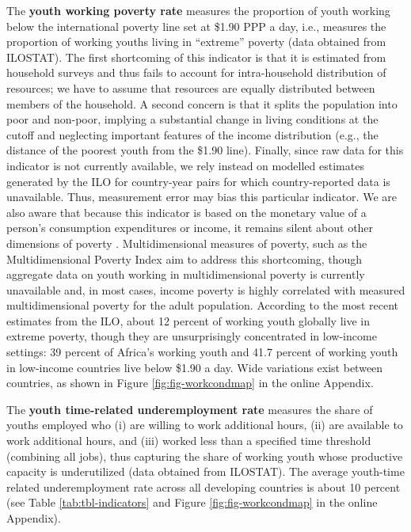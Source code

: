 \documentclass[
  a4paper, twoside, 12pt]{book}
\begin{document}
The \textbf{youth working poverty rate} measures the proportion of youth working below the international poverty line set at \$1.90 PPP a day, i.e., measures the proportion of working youths living in ``extreme'' poverty (data obtained from ILOSTAT). The first shortcoming of this indicator is that it is estimated from household surveys and thus fails to account for intra-household distribution of resources; we have to assume that resources are equally distributed between members of the household. A second concern is that it splits the population into poor and non-poor, implying a substantial change in living conditions at the cutoff and neglecting important features of the income distribution (e.g., the distance of the poorest youth from the \$1.90 line). Finally, since raw data for this indicator is not currently available, we rely instead on modelled estimates generated by the ILO for country-year pairs for which country-reported data is unavailable. Thus, measurement error may bias this particular indicator. We are also aware that because this indicator is based on the monetary value of a person's consumption expenditures or income, it remains silent about other dimensions of poverty \autocite{ophi2015}. Multidimensional measures of poverty, such as the Multidimensional Poverty Index \autocite{alkire2011} aim to address this shortcoming, though aggregate data on youth working in multidimensional poverty is currently unavailable and, in most cases, income poverty is highly correlated with measured multidimensional poverty for the adult population. According to the most recent estimates from the ILO, about 12 percent of working youth globally live in extreme poverty, though they are unsurprisingly concentrated in low-income settings: 39 percent of Africa's working youth and 41.7 percent of working youth in low-income countries live below \$1.90 a day. Wide variations exist between countries, as shown in Figure \ref{fig:fig-workcondmap} in the online Appendix.

The \textbf{youth time-related underemployment rate} measures the share of youths employed who (i) are willing to work additional hours, (ii) are available to work additional hours, and (iii) worked less than a specified time threshold (combining all jobs), thus capturing the share of working youth whose productive capacity is underutilized (data obtained from ILOSTAT). The average youth-time related underemployment rate across all developing countries is about 10 percent (see Table \ref{tab:tbl-indicators} and Figure \ref{fig:fig-workcondmap} in the online Appendix).
\end{document}

